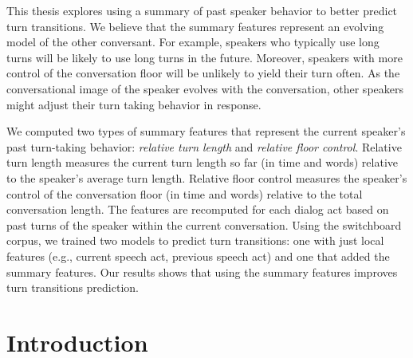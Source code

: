 \documentclass[copyright,masters]{cslu-thesis}
\begin{document}
This thesis explores using a summary of past speaker behavior to better predict turn transitions. We believe that the summary features represent an evolving model of the other conversant. For example, speakers who typically use long turns will be likely to use long turns in the future. Moreover, speakers with more control of the conversation floor will be unlikely to yield their turn often. As the conversational image of the speaker evolves with the conversation, other speakers might adjust their turn taking behavior in response.

We computed two types of summary features that represent the current speaker's past turn-taking behavior: \textit{relative turn length} and \textit{relative floor control}. Relative turn length measures the current turn length so far (in time and words) relative to the speaker's average turn length. Relative floor control measures the speaker's control of the conversation floor (in time and words) relative to the total conversation length. The features are recomputed for each dialog act based on past turns of the speaker within the current conversation. Using the switchboard corpus, we trained two models to predict turn transitions: one with just local features (e.g., current speech act, previous speech act) and one that added the summary features. Our results shows that using the summary features improves turn transitions prediction.
\body


\part{Introduction} %
\end{document}
